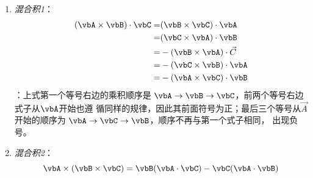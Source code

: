 \begin{enumerate}
          $\theta$为$\vbA$与$\vbB$之间的夹角，$\hat{\vbn}$为同时垂直与$\vbA$和$\vbB$的单
          位矢量。满足分配律
          \begin{equation}
              \vbA \times(\vbB + \vbC) = \vbA \times \vbB + \vbA \times \vbC
                                            \label{eq:vec-vec-cross-distri}
          \end{equation}
          不满足交换律，但有
          \begin{equation}
              \vbA \times \vbB = - \vbB \times \vbA
            \label{eq:vec-vec-cross-exchange}
          \end{equation}
          $\vbA$与$\vbB$的叉积可理解为边长为$A$和$B$的平行四边形的面积，在乘上此
          四边形法向的单位向量。
      \item \textit{混合积1}：
            \begin{equation}
                \begin{aligned}
                    (\vbA \times \vbB) \cdot \vbC 
                                        =& (\vbB \times \vbC) \cdot \vbA \\
                                        =& (\vbC \times \vbA) \cdot \vbB \\
                                        =&-(\vbB \times \vbA) \cdot \vec{C} \\
                                        =&-(\vbC \times \vbB) \cdot \vbA \\
                                        =&-(\vbA \times \vbC) \cdot \vbB \\
                \end{aligned}
                \label{eq:vec-vec-vec-mix1}
            \end{equation}
            ：上式第一个等号右边的乘积顺序是
            $\vbA \rightarrow \vbB \rightarrow \vbC$，前两个等号右边式子从$\vbA$开始也遵
            循同样的规律，因此其前面符号为正；最后三个等号从$\vec{A}$开始的顺序为
            $\vbA \rightarrow \vbC \rightarrow \vbB$，顺序不再与第一个式子相同，
            出现负号。
      \item \textit{混合积2}：
          \begin{equation}
          \vbA \times (\vbB \times \vbC) = \vbB(\vbA \cdot \vbC) - \vbC(\vbA \cdot \vbB)
                                                        \label{eq:vec-vec-vec-mix2}
          \end{equation}
\end{enumerate}

